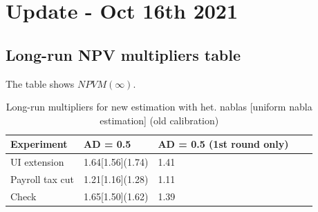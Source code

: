 \documentclass[]{article}
\begin{document}
	
\section{Update - Oct 16th 2021}

\FloatBarrier
\subsection{Long-run NPV multipliers table}

The table shows $NPVM(\infty)$.

\begin{table}[htb]
	\centering
	\begin{tabular}{@{}lllll@{}}
		\toprule
		Experiment  	& AD = 0.5 	  		&	 AD = 0.5 (1st round only)	\\ \midrule 
		UI extension    & 1.64[1.56](1.74) 	&	1.41		\\
		Payroll tax cut & 1.21[1.16](1.28)  &	1.11	   	\\
		Check		    & 1.65[1.50](1.62) 	&	1.39 		\\ \bottomrule
	\end{tabular}	
	\caption{Long-run multipliers for new estimation with het. nablas [uniform nabla estimation] (old calibration)}
\end{table}

\end{document}
